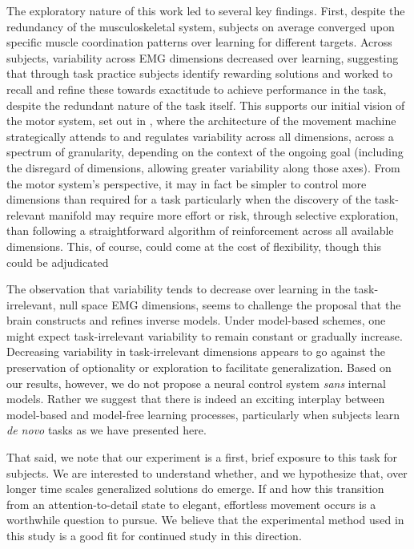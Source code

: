 \documentclass[../main.tex]{subfiles}
\begin{document}
The exploratory nature of this work led to several key findings. First, despite the redundancy of the musculoskeletal system, subjects on average converged upon specific muscle coordination patterns over learning for different targets. Across subjects, variability across EMG dimensions decreased over learning, suggesting that through task practice subjects identify rewarding solutions and worked to recall and refine these towards exactitude to achieve performance in the task, despite the redundant nature of the task itself. This supports our initial vision of the motor system, set out in , where the architecture of the movement machine strategically attends to and regulates variability across all dimensions, across a spectrum of granularity, depending on the context of the ongoing goal (including the disregard of dimensions, allowing greater variability along those axes). From the motor system's perspective, it may in fact be simpler to control more dimensions than required for a task particularly when the discovery of the task-relevant manifold may require more effort or risk, through selective exploration, than following a straightforward algorithm of reinforcement across all available dimensions. This, of course, could come at the cost of flexibility, though this could be adjudicated

The observation that variability tends to decrease over learning in the task-irrelevant, null space EMG dimensions, seems to challenge the proposal that the brain constructs and refines inverse models. Under model-based schemes, one might expect task-irrelevant variability to remain constant or gradually increase. Decreasing variability in task-irrelevant dimensions appears to go against the preservation of optionality or exploration to facilitate generalization. Based on our results, however, we do not propose a neural control system \textit{sans} internal models. Rather we suggest that there is indeed an exciting interplay between model-based and model-free learning processes, particularly when subjects learn \textit{de novo} tasks as we have presented here.

That said, we note that our experiment is a first, brief exposure to this task for subjects. We are interested to understand whether, and we hypothesize that, over longer time scales generalized solutions do emerge. If and how this transition from an attention-to-detail state to elegant, effortless movement occurs is a worthwhile question to pursue. We believe that the experimental method used in this study is a good fit for continued study in this direction.
\end{document}
